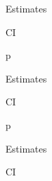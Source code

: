 \documentclass[
  letterpaper,
  DIV=11,
  numbers=noendperiod]{scrartcl}
\begin{document}
\begin{table}
\begin{minipage}[t]{\linewidth}
{Estimates

}

\end{minipage}%
\newline
\begin{minipage}[t]{\linewidth}

{\centering 

CI

}

\end{minipage}%
\newline
\begin{minipage}[t]{\linewidth}

{\centering 

p

}

\end{minipage}%
\newline
\begin{minipage}[t]{\linewidth}

{\centering 

Estimates

}

\end{minipage}%
\newline
\begin{minipage}[t]{\linewidth}

{\centering 

CI

}

\end{minipage}%
\newline
\begin{minipage}[t]{\linewidth}

{\centering 

p

}

\end{minipage}%
\newline
\begin{minipage}[t]{\linewidth}

{\centering 

Estimates

}

\end{minipage}%
\newline
\begin{minipage}[t]{\linewidth}

{\centering 

CI

}


\end{minipage}
\end{table}
\end{document}
